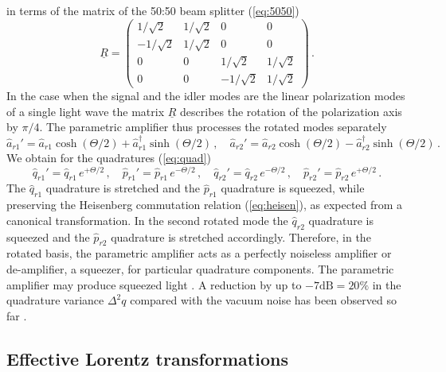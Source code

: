 \documentclass[12pt,amsmath,amssymb]{article}
\numberwithin{equation}{section}
\begin{document}
in terms of the matrix of the 50:50 beam splitter (\ref{eq:5050})
\begin{equation}
\underline{R} = \left(
    \begin{array}{cccc}
     {1}/{\sqrt{2}}&{1}/{\sqrt{2}}&0&0\\
     -{1}/{\sqrt{2}}&{1}/{\sqrt{2}}&0&0\\
     0&0&{1}/{\sqrt{2}}&{1}/{\sqrt{2}}\\
     0&0&-{1}/{\sqrt{2}}&{1}/{\sqrt{2}}
    \end{array}
\right) \,.
\end{equation}
In the case when the signal and the idler modes are the linear
polarization modes of a single light wave the matrix
$\underline{R}$ describes the rotation of the polarization axis
by $\pi/4$. The parametric amplifier thus processes the rotated modes
separately
\begin{equation}
\hat{a}_{r1}' =
\hat{a}_{r1}\cosh(\Theta/2)+\hat{a}_{r1}^\dagger\sinh(\Theta/2)
\,,\quad \hat{a}_{r2}' =
\hat{a}_{r2}\cosh(\Theta/2)-\hat{a}_{r2}^\dagger\sinh(\Theta/2)
\,.
\end{equation}
We obtain for the quadratures (\ref{eq:quad})
\begin{equation}
\hat{q}_{r1}'=\hat{q}_{r1}\,e^{+\Theta/2}\,,\quad
\hat{p}_{r1}'=\hat{p}_{r1}\,e^{-\Theta/2}\,,\quad
\hat{q}_{r2}'=\hat{q}_{r2}\,e^{-\Theta/2}\,,\quad
\hat{p}_{r2}'=\hat{p}_{r2}\,e^{+\Theta/2}\,.
\label{eq:quadsqueeze}
\end{equation}
The $\hat{q}_{r1}$ quadrature is stretched and the $\hat{p}_{r1}$
quadrature is squeezed, while preserving the Heisenberg
commutation relation (\ref{eq:heisen}), as expected from a
canonical transformation. In the second rotated mode the
$\hat{q}_{r2}$ quadrature is squeezed and the $\hat{p}_{r2}$
quadrature is stretched accordingly. Therefore, in the rotated
basis, the parametric amplifier acts as a perfectly noiseless
amplifier or de-amplifier, a squeezer, for particular quadrature
components. The parametric amplifier may produce squeezed light
\cite{Breitenbach,Leonhardt,LoudonKnight}.
A reduction by up to $-7\mbox{dB}=20\%$
in the quadrature variance $\Delta^2 q$
compared with the vacuum noise has been
observed so far \cite{Lam}.

\subsection{Effective Lorentz transformations}
\end{document}
